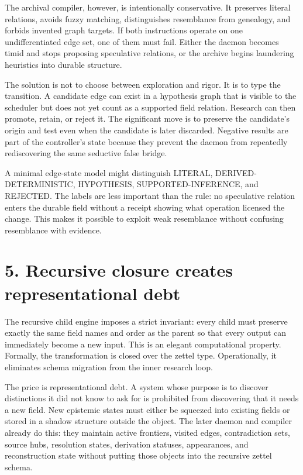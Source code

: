 \documentclass[11pt]{article}
\begin{document}
The archival compiler, however, is intentionally conservative. It preserves literal relations, avoids fuzzy matching, distinguishes resemblance from genealogy, and forbids invented graph targets. If both instructions operate on one undifferentiated edge set, one of them must fail. Either the daemon becomes timid and stops proposing speculative relations, or the archive begins laundering heuristics into durable structure.



The solution is not to choose between exploration and rigor. It is to type the transition. A candidate edge can exist in a hypothesis graph that is visible to the scheduler but does not yet count as a supported field relation. Research can then promote, retain, or reject it. The significant move is to preserve the candidate’s origin and test even when the candidate is later discarded. Negative results are part of the controller’s state because they prevent the daemon from repeatedly rediscovering the same seductive false bridge.



A minimal edge-state model might distinguish LITERAL, DERIVED-DETERMINISTIC, HYPOTHESIS, SUPPORTED-INFERENCE, and REJECTED. The labels are less important than the rule: no speculative relation enters the durable field without a receipt showing what operation licensed the change. This makes it possible to exploit weak resemblance without confusing resemblance with evidence.



\section*{5. Recursive closure creates representational debt}



The recursive child engine imposes a strict invariant: every child must preserve exactly the same field names and order as the parent so that every output can immediately become a new input. This is an elegant computational property. Formally, the transformation is closed over the zettel type. Operationally, it eliminates schema migration from the inner research loop.



The price is representational debt. A system whose purpose is to discover distinctions it did not know to ask for is prohibited from discovering that it needs a new field. New epistemic states must either be squeezed into existing fields or stored in a shadow structure outside the object. The later daemon and compiler already do this: they maintain active frontiers, visited edges, contradiction sets, source hubs, resolution states, derivation statuses, appearances, and reconstruction state without putting those objects into the recursive zettel schema.
\end{document}
